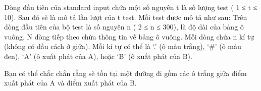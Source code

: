 Dòng đầu tiên của standard input chứa một số nguyên t là số lượng test ( 1 ≤ t ≤ 10). Sau đó sẽ là mô tả lần lượt của t test. Mỗi test được mô tả như sau: Trên dòng đầu tiên của bộ test là số nguyên n ( 2 ≤ n ≤ 300), là độ dài của bảng ô vuông. N dòng tiếp theo chứa thông tin về bảng ô vuông. Mỗi dòng chứa n kí tự (không có dấu cách ở giữa). Mỗi kí tự có thể là ‘.’ (ô màu trắng), ‘\#’ (ô màu đen), ‘A’ (ô xuất phát của A), hoặc ‘B’ (ô xuất phát của B).  

   Bạn có thể chắc chắn rằng sẽ tồn tại một đường đi gồm các ô trắng giữa điểm xuất phát của A và điểm xuất phát của B.